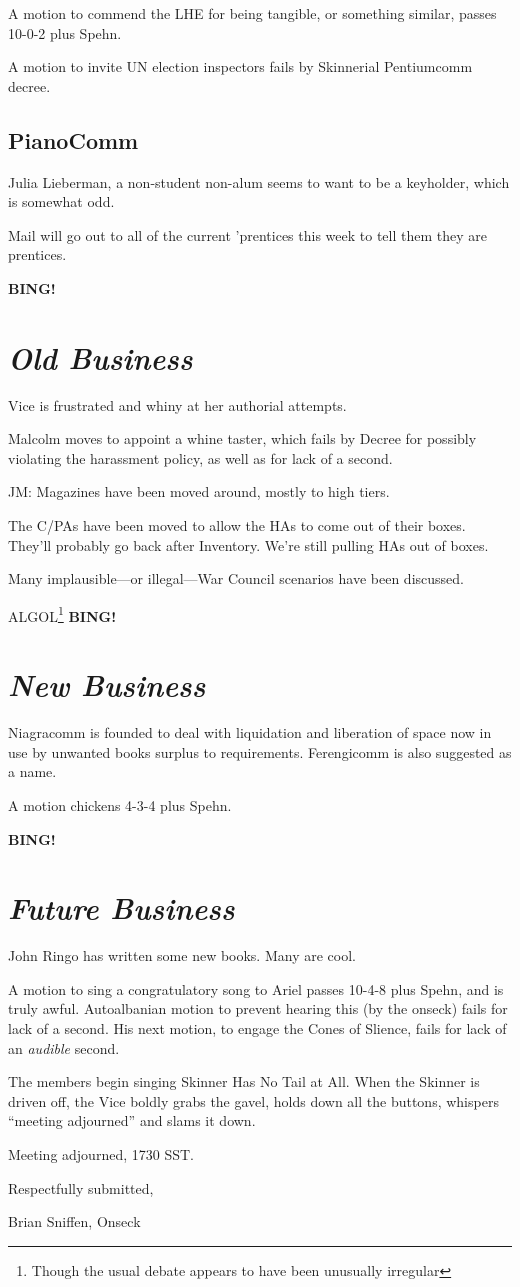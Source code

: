 \documentclass[10pt]{article}
\newcommand{\bing}{{\bf BING!} }
\newcommand{\goto}[1]{\bing \vskip 12pt \section*{{\em{#1}}}}
\newcommand{\ps}{ plus Spehn\xspace}
\begin{document}
A motion to commend the LHE for being tangible, or something similar,
passes 10-0-2\ps.

A motion to invite UN election inspectors fails by Skinnerial
Pentiumcomm decree.


\subsection*{PianoComm}
Julia Lieberman, a non-student non-alum seems to want to be a
keyholder, which is somewhat odd.

Mail will go out to all of the current 'prentices this week to tell
them they are prentices.

\goto{Old Business}

Vice is frustrated and whiny at her authorial attempts.

Malcolm moves to appoint a whine taster, which fails by Decree for
possibly violating the harassment policy, as well as for lack of a
second.

JM: Magazines have been moved around, mostly to high tiers.

The C/PAs have been moved to allow the HAs to come out of their
boxes.  They'll probably go back after Inventory.  We're still pulling
HAs out of boxes.

Many implausible---or illegal---War Council scenarios have been discussed.

ALGOL\footnote{Though the usual debate appears to have been unusually irregular}
\goto{New Business}

Niagracomm is founded to deal with liquidation and liberation of space
now in use by unwanted books surplus to requirements.  Ferengicomm is
also suggested as a name.

A motion chickens 4-3-4\ps.


\goto{Future Business}
John Ringo has written some new books.  Many are cool.

A motion to sing a congratulatory song to Ariel passes 10-4-8\ps, and
is truly awful.  Autoalbanian motion to prevent hearing this (by the
onseck) fails for lack of a second.  His next motion, to engage the
Cones of Slience, fails for lack of an \emph{audible} second.

The members begin singing Skinner Has No Tail at All.  When the
Skinner is driven off, the Vice boldly grabs the gavel, holds down all
the buttons, whispers ``meeting adjourned'' and slams it down.

\vspace{12pt}

\noindent
Meeting adjourned, 1730 SST.

\vspace{18pt}

\centerline{Respectfully submitted,}
\centerline{Brian Sniffen, Onseck}
\end{document}
